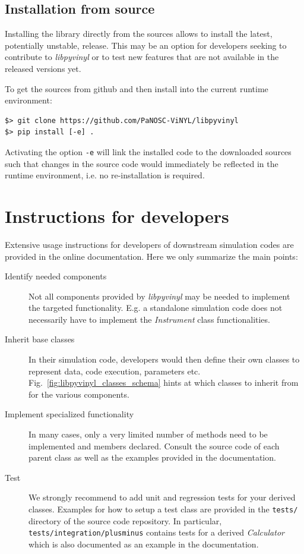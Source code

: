 \documentclass[11pt, a4paper]{article}
\begin{document}
\subsection{Installation from source}
\label{sec:source}

Installing the library directly from the sources allows to install the latest,
potentially unstable, release. This may be an option for developers seeking to
contribute to \textit{libpyvinyl} or to test new features that are not available
in the released versions yet.

To get the sources from github and then install into the current runtime environment:
\begin{verbatim}
$> git clone https://github.com/PaNOSC-ViNYL/libpyvinyl
$> pip install [-e] .
\end{verbatim}
Activating the option \texttt{-e} will link the installed code to the downloaded
sources such that changes in the source code would immediately be reflected in
the runtime environment, i.e. no re-installation is required.

\section{Instructions for developers}
\label{sec:dev}
Extensive usage instructions for developers of downstream simulation codes are
provided in the online documentation. Here we only summarize the main points:
\begin{description}
\item[Identify needed components] Not all components provided by
  \textit{libpyvinyl} may be needed to implement the targeted functionality.
  E.g. a standalone simulation code does not necessarily have to implement the
  \textit{Instrument} class functionalities.
 
\item[Inherit base classes] In their simulation code, developers would then
  define their own classes to represent data, code execution, parameters etc.
  Fig.~\ref{fig:libpyvinyl_classes_schema} hints at which classes to inherit
  from for the various components.

 
\item[Implement specialized functionality] In many cases, only a very limited
  number of methods need to be implemented and members declared. Consult the
  source code of each parent class as well as the examples provided in the
  documentation.

 
\item[Test] We strongly recommend to add unit and regression tests for your
  derived classes. Examples for how to setup a test class are provided in the
  \texttt{tests/} directory of the source code repository. In particular,
  \texttt{tests/integration/plusminus} contains tests for a derived
  \textit{Calculator} which is also documented as an example in the documentation.
  
\end{description}

\end{document}
